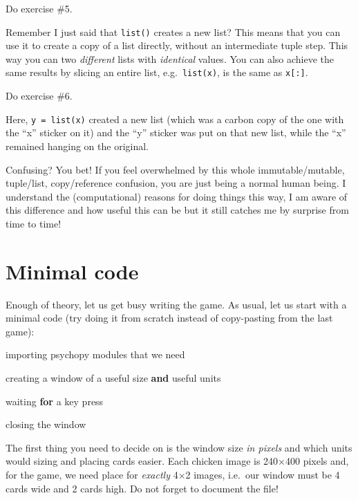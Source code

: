 \documentclass[
]{book}
\newenvironment{Shaded}{\begin{snugshade}}{\end{snugshade}}
\newcommand{\ControlFlowTok}[1]{\textcolor[rgb]{0.13,0.29,0.53}{\textbf{#1}}}
\newcommand{\KeywordTok}[1]{\textcolor[rgb]{0.13,0.29,0.53}{\textbf{#1}}}
\newcommand{\NormalTok}[1]{#1}
\begin{document}
Do exercise \#5.

Remember I just said that \texttt{list()} creates a new list? This means that you can use it to create a copy of a list directly, without an intermediate tuple step. This way you can two \emph{different} lists with \emph{identical} values. You can also achieve the same results by slicing an entire list, e.g.~\texttt{list(x)}, is the same as \texttt{x{[}:{]}}.

Do exercise \#6.

Here, \texttt{y\ =\ list(x)} created a new list (which was a carbon copy of the one with the ``x'' sticker on it) and the ``y'' sticker was put on that new list, while the ``x'' remained hanging on the original.

Confusing? You bet! If you feel overwhelmed by this whole immutable/mutable, tuple/list, copy/reference confusion, you are just being a normal human being. I understand the (computational) reasons for doing things this way, I am aware of this difference and how useful this can be but it still catches me by surprise from time to time!

\hypertarget{minimal-code}{%
\section{Minimal code}\label{minimal-code}}

Enough of theory, let us get busy writing the game. As usual, let us start with a minimal code (try doing it from scratch instead of copy-pasting from the last game):

\begin{Shaded}
\begin{Highlighting}[]
\NormalTok{importing psychopy modules that we need}
 
\NormalTok{creating a window of a useful size }\KeywordTok{and}\NormalTok{ useful units}

\NormalTok{waiting }\ControlFlowTok{for}\NormalTok{ a key press}

\NormalTok{closing the window}
\end{Highlighting}
\end{Shaded}

The first thing you need to decide on is the window size \emph{in pixels} and which units would sizing and placing cards easier. Each chicken image is 240×400 pixels and, for the game, we need place for \emph{exactly} 4×2 images, i.e.~our window must be 4 cards wide and 2 cards high. Do not forget to document the file!
\end{document}
